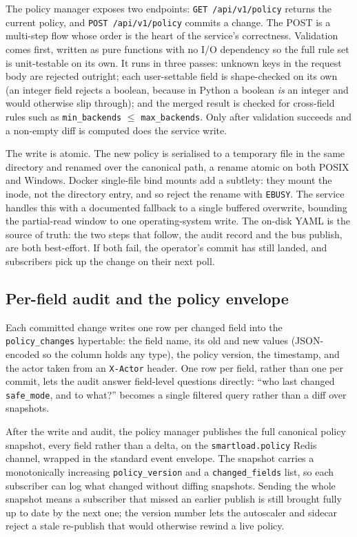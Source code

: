 The policy manager exposes two endpoints: \texttt{GET /api/v1/policy} returns the
current policy, and \texttt{POST /api/v1/policy} commits a change. The POST is a
multi-step flow whose order is the heart of the service's correctness. Validation
comes first, written as pure functions with no I/O dependency so the full rule set
is unit-testable on its own. It runs in three passes: unknown keys in the request
body are rejected outright; each user-settable field is shape-checked on its own (an
integer field rejects a boolean, because in Python a boolean \emph{is} an integer
and would otherwise slip through); and the merged result is checked for cross-field
rules such as \texttt{min\_backends} $\leq$ \texttt{max\_backends}. Only after
validation succeeds and a non-empty diff is computed does the service write.

The write is atomic. The new policy is serialised to a temporary file in the same
directory and renamed over the canonical path, a rename atomic on both POSIX and
Windows. Docker single-file bind mounts add a subtlety: they mount the inode, not
the directory entry, and so reject the rename with \texttt{EBUSY}. The service
handles this with a documented fallback to a single buffered overwrite, bounding the
partial-read window to one operating-system write. The on-disk YAML is the source of
truth: the two steps that follow, the audit record and the bus publish, are both
best-effort. If both fail, the operator's commit has still landed, and subscribers
pick up the change on their next poll.

\subsection{Per-field audit and the policy envelope}
\label{sec:ima:audit}

Each committed change writes one row per changed field into the
\texttt{policy\_changes} hypertable: the field name, its old and new values
(JSON-encoded so the column holds any type), the policy version, the timestamp, and
the actor taken from an \texttt{X-Actor} header. One row per field, rather than one
per commit, lets the audit answer field-level questions directly: ``who last changed
\texttt{safe\_mode}, and to what?'' becomes a single filtered query rather than a
diff over snapshots.

After the write and audit, the policy manager publishes the full canonical policy
snapshot, every field rather than a delta, on the \texttt{smartload.policy}
Redis~\cite{carlson2013redis} channel, wrapped in the standard event envelope. The
snapshot carries a monotonically increasing \texttt{policy\_version} and a
\texttt{changed\_fields} list, so each subscriber can log what changed without
diffing snapshots. Sending the whole snapshot means a subscriber that missed an
earlier publish is still brought fully up to date by the next one; the version
number lets the autoscaler and sidecar reject a stale re-publish that would
otherwise rewind a live policy.

